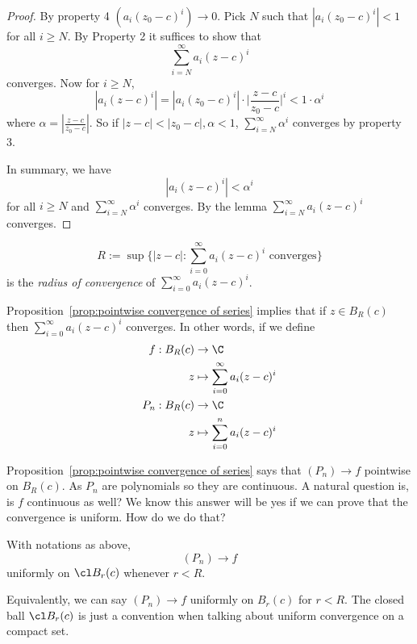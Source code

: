 \documentclass[a4paper]{article}
\theoremstyle{definition}
\begin{document}
\begin{proof}
  By property 4 \((a_i(z_0-c)^i)\to 0\). Pick \(N\) such that \(|a_i(z_0-c)^i|<1\) for all \(i\geq N\). By Property 2 it suffices to show that
  \[
    \sum_{i=N}^{\infty}a_i(z-c)^i
  \]
  converges. Now for \(i\geq N\),
  \[
    \label{eqn:fundamental est}
    \boxed{
    |a_i(z-c)^i| = |a_i(z_0-c)^i| \cdot \Big| \frac{z-c}{z_0-c} \Big|^i < 1\cdot \alpha^i
    }
    \tag*{Fundamental Estimate for Power Series}
    \]
  where \(\alpha = |\frac{z-c}{z_0-c}|\). So if \(|z-c| < |z_0-c|,\alpha<1\), \(\sum_{i=N}^{\infty}\alpha^i \) converges by property 3.

  In summary, we have
  \[
|a_i(z-c)^i| < \alpha^i
\]
for all \(i\geq N\) and \(\sum_{i=N}^{\infty}\alpha^i \) converges. By the lemma \(\sum_{i=N}^{\infty}a_i(z-c)^i \) converges.
\end{proof}

\begin{definition}
  \[
    R := \sup \{ |z-c|: \sum_{i=0}^{\infty}a_i (z-c)^i \text{ converges}\}
  \]
  is the \emph{radius of convergence} of \(\sum_{i=0}^{\infty}a_i(z-c)^i \).
\end{definition}

Proposition~\ref{prop:pointwise convergence of series} implies that if \(z\in B_R(c)\) then \(\sum_{i=0}^{\infty}a_i(z-c)^i \) converges. In other words, if we define
\begin{align*}
  f: B_R(c) &\to \C \\
  z &\mapsto \sum_{i=0}^{\infty} a_i(z-c)^i \\
  P_n: B_R(c) &\to \C \\
  z &\mapsto \sum_{i=0}^{n} a_i(z-c)^i
\end{align*}

Proposition~\ref{prop:pointwise convergence of series} says that \((P_n)\to f\) pointwise on \(B_R(c)\). As \(P_n\) are polynomials so they are continuous. A natural question is, is \(f\) continuous as well? We know this answer will be yes if we can prove that the convergence is uniform. How do we do that?

\begin{theorem}
  With notations as above,
  \[
(P_n)\to f
\]
uniformly on \(\cl B_r(c)\) whenever \(r<R\).
\end{theorem}

\begin{note}
  Equivalently, we can say \((P_n)\to f\) uniformly on \(B_r(c)\) for \(r<R\). The closed ball \(\cl B_r(c)\) is just a convention when talking about uniform convergence on a compact set.
\end{note}
\end{document}

